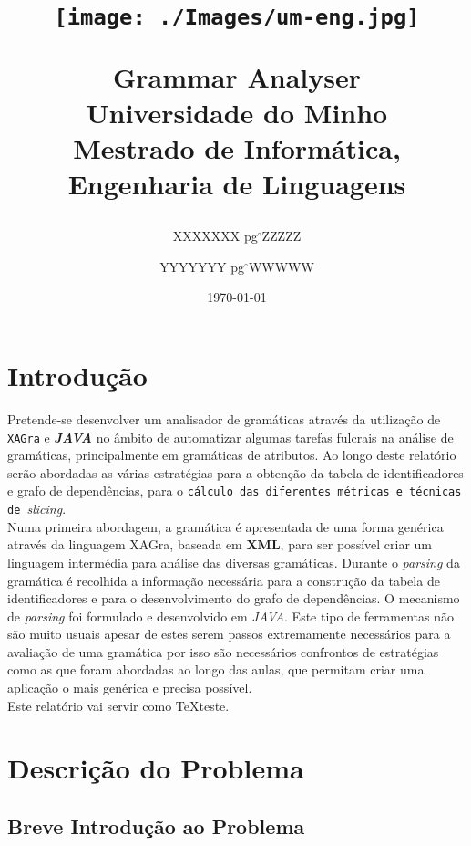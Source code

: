 \documentclass[a4paper,11pt]{article}
\title{\huge \bigskip
\begin{figure}[!ht]
\begin{flushright}
\texttt{[image: ./Images/um-eng.jpg]} \vspace{1cm}
\end{flushright}
\end{figure}
{\huge Grammar Analyser} \vspace{3cm} \\
{\LARGE Universidade do Minho}\\
{\large Mestrado de Informática, Engenharia de Linguagens}
}
\author{\large XXXXXXX pg$^{\circ}$ZZZZZ \and \large YYYYYYY pg$^{\circ}$WWWWW}
\date{\vspace{3cm} \LARGE \today}
\begin{document}
\maketitle
\newpage
\large \tableofcontents
{}

\newpage
\section{\LARGE Introdução}
\hspace{1cm}Pretende-se desenvolver um analisador de gramáticas através da utilização de \verb|XAGra| e \textbf{\emph{JAVA}} no âmbito de automatizar algumas tarefas fulcrais na análise de gramáticas, principalmente em gramáticas de atributos. Ao longo deste relatório serão abordadas as várias estratégias para a obtenção da tabela de identificadores e grafo de dependências, para o \verb*|cálculo das diferentes métricas e técnicas de |\emph{slicing}.\\
\newline
Numa primeira abordagem, a gramática é apresentada de uma forma genérica através da linguagem XAGra, baseada em \textbf{XML}, para ser possível criar um linguagem intermédia para análise das diversas gramáticas. Durante o \emph{parsing} da gramática é recolhida a informação necessária para a construção da tabela de identificadores e para o desenvolvimento do grafo de dependências. O mecanismo de \emph{parsing} foi formulado e desenvolvido em \emph{JAVA}. Este tipo de ferramentas não são muito usuais apesar de estes serem passos extremamente necessários para a avaliação de uma gramática por isso são necessários confrontos de estratégias como as que foram abordadas ao longo das aulas, que permitam criar uma aplicação o mais genérica e precisa possível.\\
Este relatório vai servir como \TeX{}teste.

\newpage
\section{\LARGE Descrição do Problema}

\subsection{\large Breve Introdução ao Problema}
\end{document}
